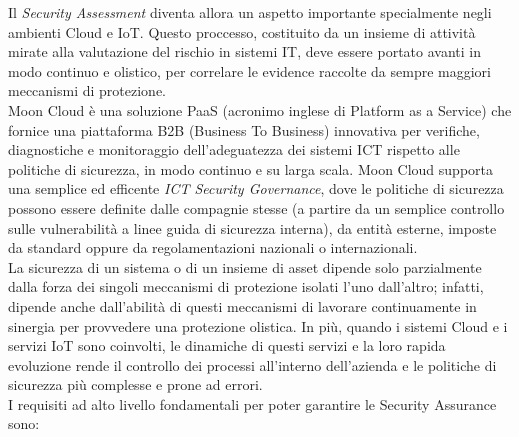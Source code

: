 Il \textit{Security Assessment} diventa allora un aspetto importante specialmente negli ambienti Cloud e IoT. Questo proccesso, costituito
da un insieme di attività mirate alla valutazione del rischio in sistemi IT, deve essere portato avanti in modo continuo e olistico, per 
correlare le evidence raccolte da sempre maggiori meccanismi di protezione. \cite{mooncloud-semi-automatic-and-trustworthy}
\\
Moon Cloud è una soluzione PaaS (acronimo inglese di Platform as a Service) che fornice una piattaforma B2B (Business To Business) 
innovativa per verifiche, diagnostiche e monitoraggio dell'adeguatezza dei sistemi ICT rispetto alle politiche di sicurezza, in modo 
continuo e su larga scala. Moon Cloud supporta una semplice ed efficente \textit{ICT Security Governance}, dove le politiche di sicurezza 
possono essere definite dalle compagnie stesse (a partire da un semplice controllo sulle vulnerabilità a linee guida di
sicurezza interna), da entità esterne, imposte da standard oppure da regolamentazioni nazionali o internazionali.
\\
La sicurezza di un sistema o di un insieme di asset dipende solo parzialmente dalla forza dei singoli meccanismi di protezione isolati
l'uno dall'altro; infatti, dipende anche dall'abilità di questi meccanismi di lavorare continuamente in sinergia per provvedere una 
protezione olistica.
In più, quando i sistemi Cloud e i servizi IoT sono coinvolti, le dinamiche di questi servizi e la loro rapida evoluzione rende il 
controllo dei processi all'interno dell'azienda e le politiche di sicurezza più complesse e prone ad errori.
\\
I requisiti ad alto livello fondamentali per poter garantire le Security Assurance sono:
